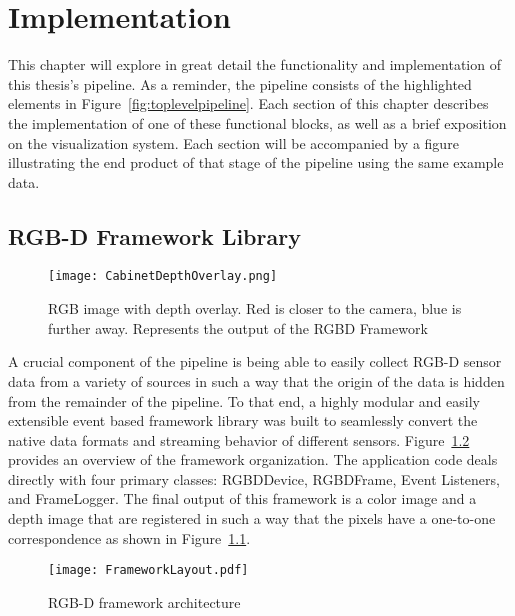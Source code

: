 \chapter{Implementation}
\label{chap:implementation}
This chapter will explore in great detail the functionality and implementation of this thesis's pipeline. As a reminder, the pipeline consists of the highlighted elements in Figure~\ref{fig:toplevelpipeline}. Each section of this chapter describes the implementation of one of these functional blocks, as well as a brief exposition on the visualization system. Each section will be accompanied by a figure illustrating the end product of that stage of the pipeline using the same example data.

\section{RGB-D Framework Library}
\begin{figure}[!htbp]
    \centering
    \texttt{[image: CabinetDepthOverlay.png]}
    \caption{RGB image with depth overlay. Red is closer to the camera, blue is further away. Represents the output of the RGBD Framework}
    \label{fig:rgbdframeworkoutput}
\end{figure}
A crucial component of the pipeline is being able to easily collect RGB-D sensor data from a variety of sources in such a way that the origin of the data is hidden from the remainder of the pipeline. To that end, a highly modular and easily extensible event based framework library was built to seamlessly convert the native data formats and streaming behavior of different sensors. Figure~\ref{fig:rgbdframework} provides an overview of the framework organization. The application code deals directly with four primary classes: RGBDDevice, RGBDFrame, Event Listeners, and FrameLogger. The final output of this framework is a color image and a depth image that are registered in such a way that the pixels have a one-to-one correspondence as shown in Figure~\ref{fig:rgbdframeworkoutput}.
\begin{figure}[!htbp]
    \centering
    \texttt{[image: FrameworkLayout.pdf]}
    \caption{RGB-D framework architecture}
    \label{fig:rgbdframework}
\end{figure}

